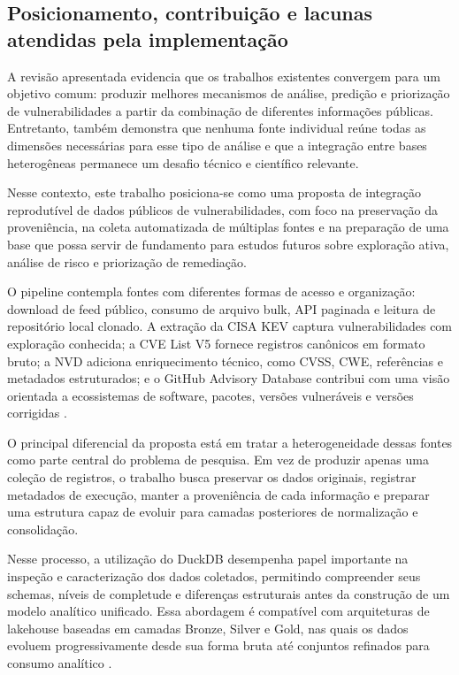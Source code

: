 \subsection{Posicionamento, contribuição e lacunas atendidas pela implementação}

A revisão apresentada evidencia que os trabalhos existentes convergem para um objetivo comum: produzir melhores mecanismos de análise, predição e priorização de vulnerabilidades a partir da combinação de diferentes informações públicas. Entretanto, também demonstra que nenhuma fonte individual reúne todas as dimensões necessárias para esse tipo de análise e que a integração entre bases heterogêneas permanece um desafio técnico e científico relevante.

Nesse contexto, este trabalho posiciona-se como uma proposta de integração reprodutível de dados públicos de vulnerabilidades, com foco na preservação da proveniência, na coleta automatizada de múltiplas fontes e na preparação de uma base que possa servir de fundamento para estudos futuros sobre exploração ativa, análise de risco e priorização de remediação.

O pipeline contempla fontes com diferentes formas de acesso e organização: download de feed público, consumo de arquivo bulk, API paginada e leitura de repositório local clonado. A extração da CISA KEV captura vulnerabilidades com exploração conhecida; a CVE List V5 fornece registros canônicos em formato bruto; a NVD adiciona enriquecimento técnico, como CVSS, CWE, referências e metadados estruturados; e o GitHub Advisory Database contribui com uma visão orientada a ecossistemas de software, pacotes, versões vulneráveis e versões corrigidas \cite{cisa_kev_catalog,cve_program_overview,nvd_home,first_cvss,mitre_cwe,github_advisory_database_docs,github_advisory_database_repo}.

O principal diferencial da proposta está em tratar a heterogeneidade dessas fontes como parte central do problema de pesquisa. Em vez de produzir apenas uma coleção de registros, o trabalho busca preservar os dados originais, registrar metadados de execução, manter a proveniência de cada informação e preparar uma estrutura capaz de evoluir para camadas posteriores de normalização e consolidação.

Nesse processo, a utilização do DuckDB desempenha papel importante na inspeção e caracterização dos dados coletados, permitindo compreender seus schemas, níveis de completude e diferenças estruturais antes da construção de um modelo analítico unificado. Essa abordagem é compatível com arquiteturas de lakehouse baseadas em camadas Bronze, Silver e Gold, nas quais os dados evoluem progressivamente desde sua forma bruta até conjuntos refinados para consumo analítico \cite{duckdb_why_duckdb,raasveldt2019_duckdb}.

